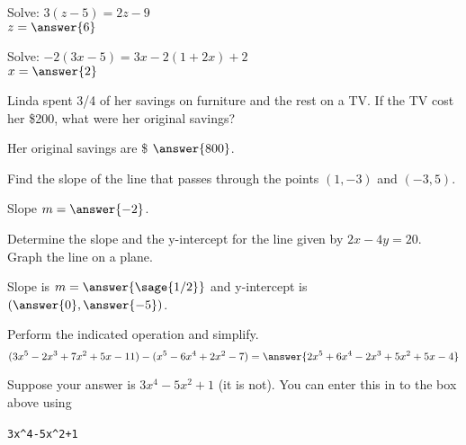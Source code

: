 \documentclass{ximera}
\begin{document}
\begin{problem}
Solve: \hspace{1cm} $3(z-5) = 2z-9$\\

$z=\answer{6}$



\end{problem}



\begin{problem}
Solve: \hspace{1 cm}$ -2(3x-5) = 3x - 2(1 + 2x) + 2$ \\

$x=\answer{2}$

\end{problem}



\begin{problem}
Linda spent 3/4 of her savings on furniture and the rest on a TV. If the TV cost her \$200, what were her original savings? 

Her original savings are \$ $\answer{800}$.



\end{problem}



\begin{problem}
Find the slope of the line that passes through the points $(1,-3)$ and $(-3,5)$.

Slope $m=\answer{-2}$.




\end{problem}



\begin{problem}
Determine the slope and the y-intercept for the line given by $2x - 4y = 20$. Graph the line on a plane.

Slope is $m=\answer{\sage{1/2}}$ and y-intercept is $(\answer{0},\answer{-5})$.


\end{problem}



\begin{problem}
Perform the indicated operation and simplify.
$$(3x^5 - 2x^3 +7x^2+5x -11) - (x^5 - 6x^4 + 2x^2 -7)
=
\answer{2x^5+6x^4-2x^3+5x^2+5x-4}$$

\begin{hint}
Suppose your answer is $3x^4-5x^2+1$ (it is not). You can enter this in to the box above using

\hfill 
\verb|3x^4-5x^2+1|
\hfill \,
\end{hint}





\end{problem}
\end{document}

